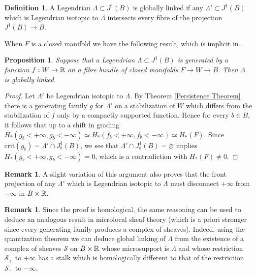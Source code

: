 \documentclass[11pt]{article}
\numberwithin{equation}{section}\providecommand{\dpl}{\displaystyle}
\let\mathcal\mathscr
\newcommand{\crit}{\mathrm{crit}}
\theoremstyle{plain}
\newtheorem{proposition}[theorem]{Proposition}
\theoremstyle{definition}
\newtheorem{definition}[theorem]{Definition}
\newtheorem{remark}[theorem]{Remark}
\newcommand{\cS}{\mathcal{S}}\newcommand{\cT}{\mathcal{T}}
\begin{document}
\begin{definition}
A Legendrian $\Lambda \subset J^1(B)$ is globally linked if any $\Lambda' \subset J^1(B)$ which is Legendrian isotopic to $\Lambda$ intersects every fibre of the projection $J^1(B) \to B$.
\end{definition}

When $F$ is a closed manifold we have the following result, which is implicit in \cite{EG98}.

\begin{proposition}\label{globally linked}
Suppose that a Legendrian $\Lambda \subset J^1(B)$ is generated by a function $f:W \to \mathbb{R}$ on a fibre bundle of closed manifolds $F \to W \to B$. Then $\Lambda$ is globally linked.
\end{proposition}

\begin{proof}
Let $\Lambda'$ be Legendrian isotopic to $\Lambda$. By Theorem \ref{Persistence Theorem} there is a generating family $g$ for $\Lambda'$ on a stabilization of $W$ which differs from the stabilization of $f$ only by a compactly supported function. Hence for every $b \in B$, it follows that up to a shift in grading $H_*(g_b<+ \infty, g_b<-\infty) \simeq H_*(f_b<+\infty, f_b<-\infty) \simeq H_*(F)$. Since $\crit(g_b) = \Lambda' \cap J^1_b(B)$, we see that $\Lambda' \cap J^1_b(B) = \varnothing$ implies $H_*(g_b<+ \infty, g_b<-\infty)=0$, which is a contradiction with $H_*(F) \neq 0$. \end{proof}

\begin{remark}
A slight variation of this argument also proves that the front projection of any $\Lambda'$ which is Legendrian isotopic to $\Lambda$ must disconnect $+\infty$ from $- \infty$ in $B \times \mathbb{R}$.
\end{remark}

\begin{remark} Since the proof is homological, the same reasoning can be used to deduce an analogous result in microlocal sheaf theory (which is a priori stronger since every generating family produces a complex of sheaves). Indeed, using the quantization theorem \cite{GKS12} we can deduce global linking of $\Lambda$ from the existence of a complex of sheaves $\cS$ on $B \times \mathbb{R}$ whose microsupport is $\Lambda$ and whose restriction $\cS_+$ to $+\infty$ has a stalk which is homologically different to that of the restriction $\cS_-$ to $-\infty$.
\end{remark}
\end{document}
